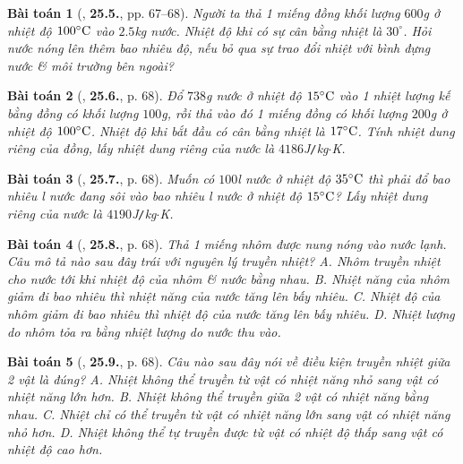 \documentclass{article}
\numberwithin{equation}{section}
\newtheorem{baitoan}{Bài toán}
\begin{document}
\begin{baitoan}[\cite{SBT_Vat_Ly_8}, \textbf{25.5.}, pp. 67--68]
	Người ta thả 1 miếng đồng khối lượng $600$\emph{g} ở nhiệt độ $100^\circ{\rm C}$ vào $2.5$\emph{kg} nước. Nhiệt độ khi có sự cân bằng nhiệt là $30^\circ$. Hỏi nước nóng lên thêm bao nhiêu độ, nếu bỏ qua sự trao đổi nhiệt với bình đựng nước \& môi trường bên ngoài?
\end{baitoan}

\begin{baitoan}[\cite{SBT_Vat_Ly_8}, \textbf{25.6.}, p. 68]
	Đổ $738$\emph{g} nước ở nhiệt độ $15^\circ{\rm C}$ vào 1 nhiệt lượng kế bằng đồng có khối lượng $100$\emph{g}, rồi thả vào đó 1 miếng đồng có khối lượng $200$\emph{g} ở nhiệt độ $100^\circ{\rm C}$. Nhiệt độ khi bắt đầu có cân bằng nhiệt là $17^\circ{\rm C}$. Tính nhiệt dung riêng của đồng, lấy nhiệt dung riêng của nước là $4186$\emph{J\texttt{/}kg$\cdot$K}.
\end{baitoan}

\begin{baitoan}[\cite{SBT_Vat_Ly_8}, \textbf{25.7.}, p. 68]
	Muốn có $100$\emph{l} nước ở nhiệt độ $35^\circ{\rm C}$ thì phải đổ bao nhiêu \emph{l} nước đang sôi vào bao nhiêu \emph{l} nước ở nhiệt độ $15^\circ{\rm C}$? Lấy nhiệt dung riêng của nước là $4190$\emph{J\texttt{/}kg$\cdot$K}.
\end{baitoan}

\begin{baitoan}[\cite{SBT_Vat_Ly_8}, \textbf{25.8.}, p. 68]
	Thả 1 miếng nhôm được nung nóng vào nước lạnh. Câu mô tả nào sau đây trái với nguyên lý truyền nhiệt? {\sf A.} Nhôm truyền nhiệt cho nước tới khi nhiệt độ của nhôm \& nước bằng nhau. {\sf B.} Nhiệt năng của nhôm giảm đi bao nhiêu thì nhiệt năng của nước tăng lên bấy nhiêu. {\sf C.} Nhiệt độ của nhôm giảm đi bao nhiêu thì nhiệt độ của nước tăng lên bấy nhiêu. {\sf D.} Nhiệt lượng do nhôm tỏa ra bằng nhiệt lượng do nước thu vào.
\end{baitoan}

\begin{baitoan}[\cite{SBT_Vat_Ly_8}, \textbf{25.9.}, p. 68]
	Câu nào sau đây nói về điều kiện truyền nhiệt giữa 2 vật là đúng? {\sf A.} Nhiệt không thể truyền từ vật có nhiệt năng nhỏ sang vật có nhiệt năng lớn hơn. {\sf B.} Nhiệt không thể truyền giữa 2 vật có nhiệt năng bằng nhau. {\sf C.} Nhiệt chỉ có thể truyền từ vật có nhiệt năng lớn sang vật có nhiệt năng nhỏ hơn. {\sf D.} Nhiệt không thể tự truyền được từ vật có nhiệt độ thấp sang vật có nhiệt độ cao hơn.
\end{baitoan}
\end{document}
